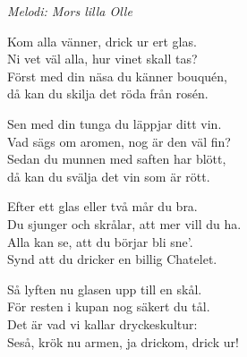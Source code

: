 {\footnotesize\textit{Melodi: Mors lilla Olle}}\par
\vspace{10pt}
Kom alla vänner, drick ur ert glas.\\
Ni vet väl alla, hur vinet skall tas?\\
Först med din näsa du känner bouquén,\\
då kan du skilja det röda från rosén.\par
\vspace{10pt}
Sen med din tunga du läppjar ditt vin.\\
Vad sägs om aromen, nog är den väl fin?\\
Sedan du munnen med saften har blött,\\
då kan du svälja det vin som är rött.\par
\vspace{10pt}
Efter ett glas eller två mår du bra.\\
Du sjunger och skrålar, att mer vill du ha.\\
Alla kan se, att du börjar bli sne'.\\
Synd att du dricker en billig Chatelet.\par
\vspace{10pt}
Så lyften nu glasen upp till en skål.\\
För resten i kupan nog säkert du tål.\\
Det är vad vi kallar dryckeskultur:\\
Seså, krök nu armen, ja drickom, drick ur!
